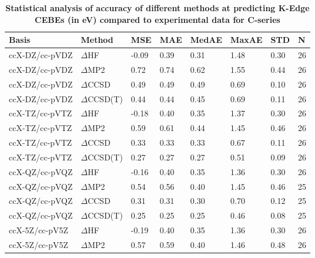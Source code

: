\begin{table}
  \caption{\textbf{Statistical analysis of accuracy of different methods at predicting K-Edge CEBEs (in eV) compared to experimental data for C-series}}
  \begin{tabular}{l l l l l l l l }
    \toprule
    \textbf{Basis} & \textbf{Method} & \textbf{MSE} & \textbf{MAE} & \textbf{MedAE} & \textbf{MaxAE} & \textbf{STD} & \textbf{N} \\ 
    \midrule
    ccX-DZ/cc-pVDZ & $\Delta$HF & -0.09 & 0.39 & 0.31 & 1.48 & 0.30 & 26 \\ 
    ccX-DZ/cc-pVDZ & $\Delta$MP2 & 0.72 & 0.74 & 0.62 & 1.55 & 0.44 & 26 \\ 
    ccX-DZ/cc-pVDZ & $\Delta$CCSD & 0.49 & 0.49 & 0.49 & 0.69 & 0.10 & 26 \\ 
    ccX-DZ/cc-pVDZ & $\Delta$CCSD(T) & 0.44 & 0.44 & 0.45 & 0.69 & 0.11 & 26 \\ 
    ccX-TZ/cc-pVTZ & $\Delta$HF & -0.18 & 0.40 & 0.35 & 1.37 & 0.30 & 26 \\ 
    ccX-TZ/cc-pVTZ & $\Delta$MP2 & 0.59 & 0.61 & 0.44 & 1.45 & 0.46 & 26 \\ 
    ccX-TZ/cc-pVTZ & $\Delta$CCSD & 0.33 & 0.33 & 0.33 & 0.67 & 0.11 & 26 \\ 
    ccX-TZ/cc-pVTZ & $\Delta$CCSD(T) & 0.27 & 0.27 & 0.27 & 0.51 & 0.09 & 26 \\ 
    ccX-QZ/cc-pVQZ & $\Delta$HF & -0.16 & 0.40 & 0.35 & 1.36 & 0.30 & 26 \\ 
    ccX-QZ/cc-pVQZ & $\Delta$MP2 & 0.54 & 0.56 & 0.40 & 1.45 & 0.46 & 25 \\ 
    ccX-QZ/cc-pVQZ & $\Delta$CCSD & 0.31 & 0.31 & 0.30 & 0.70 & 0.12 & 25 \\ 
    ccX-QZ/cc-pVQZ & $\Delta$CCSD(T) & 0.25 & 0.25 & 0.25 & 0.46 & 0.08 & 25 \\ 
    ccX-5Z/cc-pV5Z & $\Delta$HF & -0.19 & 0.40 & 0.35 & 1.36 & 0.30 & 26 \\ 
    ccX-5Z/cc-pV5Z & $\Delta$MP2 & 0.57 & 0.59 & 0.40 & 1.46 & 0.48 & 26 \\ 
    \bottomrule
  \end{tabular}
\end{table}
